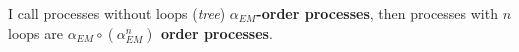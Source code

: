 \documentclass[TheoreticalPhy_ModB.tex]{subfiles}
\begin{document}
{\begin{comment}
\[
\begin{tikzpicture}[baseline=(e2)]
	\begin{feynman}[small]
		\vertex(e1);
		\vertex[below right=0.8cm of e1,blob](e2){\hspace{1.5cm}};
		\vertex[below left=of e2](e3);
		\vertex[above right=of e2](e5);
		\vertex[below right=of e2](e6);
		\diagram{
			(e1) -- (e2) -- (e3),
			(e5) -- (e2) -- (e6),
		};
	\end{feynman}
\end{tikzpicture}
\quad=\quad
\begin{tikzpicture}[baseline=(e2)]
	\begin{feynman}[small]
		\vertex(e1);
		\vertex[below right=of e1](e2);
		\vertex[below left=of e2](e3);
		\vertex[right=of e2](e4);
		\vertex[above right=of e4](e5);
		\vertex[below right=of e4](e6);
		\diagram{
			(e1) -- (e2) -- (e3),
			(e2) -- [boson] (e4),
			(e5) -- (e4) -- (e6),
		};
	\end{feynman}
\end{tikzpicture}
\quad+\quad
\begin{tikzpicture}[baseline=(e2)]
	\begin{feynman}[small]
		\vertex(e1);
		\vertex[below right=of e1](e2);
		\vertex[below left=of e2](e3);
		\vertex[right=of e2](e4);
		\vertex[above right=of e4](e5);
		\vertex[below right=of e4](e6);
		\vertex[above left=0.3cm of e2](e7);
		\vertex[above right=0.3cm of e4](e8);
		\diagram{
			(e1) -- (e2) -- (e3),
			(e2) -- [boson] (e4),
			(e5) -- (e4) -- (e6),
			(e7) -- [boson] (e8),
		};
	\end{feynman}
\end{tikzpicture}
\quad+\quad
\begin{tikzpicture}[baseline=(e2)]
	\begin{feynman}[small]
		\vertex(e1);
		\vertex[below right=of e1](e2);
		\vertex[below left=of e2](e3);
		\vertex[right=of e2](e4);
		\vertex[above right=of e4](e5);
		\vertex[below right=of e4](e6);
		\vertex[below right=0.5cm of e4](e7);
		\vertex[above right=0.5cm of e4](e8);
		\diagram{
			(e1) -- (e2) -- (e3),
			(e2) -- [boson] (e4),
			(e5) -- (e4) -- (e6),
			(e7) -- [boson] (e8),
		};
	\end{feynman}
\end{tikzpicture}
\]
\onlyinsubfile{\end{comment}}

I call processes without loops (\emph{tree}) \textbf{$\alpha_{EM}$-order processes}, then processes with $n$ loops are \textbf{$\alpha_{EM}\circ(\alpha_{EM}^n)$ order processes}. 
\end{document}
